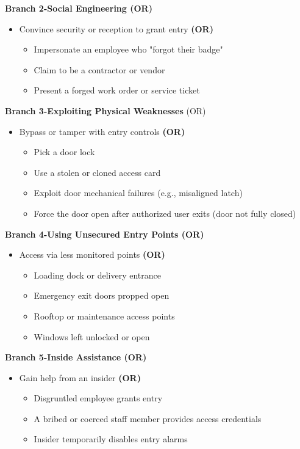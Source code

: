 \textbf{Branch 2-Social Engineering (OR)}
\begin{itemize}
    \item Convince security or reception to grant entry \textbf{(OR)}
    \begin{itemize}
        \item Impersonate an employee who "forgot their badge"
        \item Claim to be a contractor or vendor
        \item Present a forged work order or service ticket
    \end{itemize}
\end{itemize}

\textbf{Branch 3-Exploiting Physical Weaknesses }(OR)
\begin{itemize}
    \item Bypass or tamper with entry controls \textbf{(OR)}
    \begin{itemize}
        \item Pick a door lock
        \item Use a stolen or cloned access card
        \item Exploit door mechanical failures (e.g., misaligned latch)
        \item Force the door open after authorized user exits (door not fully closed)
    \end{itemize}
\end{itemize}

\textbf{Branch 4-Using Unsecured Entry Points (OR)}
\begin{itemize}
    \item Access via less monitored points \textbf{(OR)}
    \begin{itemize}
        \item Loading dock or delivery entrance
        \item Emergency exit doors propped open
        \item Rooftop or maintenance access points
        \item Windows left unlocked or open
    \end{itemize}
\end{itemize}

\textbf{Branch 5-Inside Assistance (OR)}
\begin{itemize}
    \item Gain help from an insider \textbf{(OR)}
    \begin{itemize}
        \item Disgruntled employee grants entry
        \item A bribed or coerced staff member provides access credentials
        \item Insider temporarily disables entry alarms
    \end{itemize}
\end{itemize}

